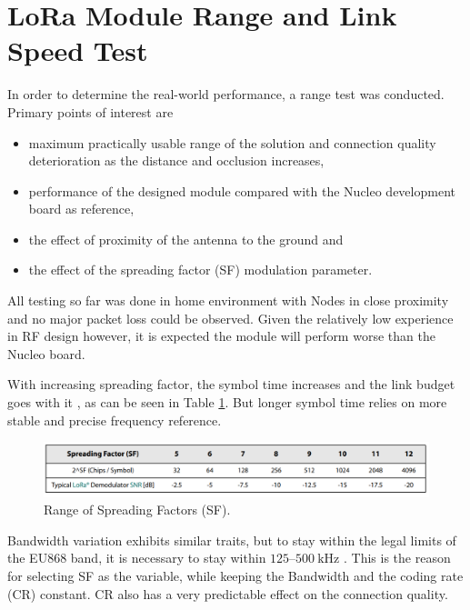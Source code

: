 
\section{\label{section:range-test}LoRa Module Range and Link Speed Test}
In order to determine the real-world performance, a range test was conducted. Primary points of interest are
\begin{itemize}
    \item maximum practically usable range of the solution and connection quality deterioration as the distance and occlusion increases,
    \item performance of the designed module compared with the Nucleo development board as reference,
    \item the effect of proximity of the antenna to the ground and
    \item the effect of the spreading factor (SF) modulation parameter.
\end{itemize}

All testing so far was done in home environment with Nodes in close proximity and no major packet loss could be observed. Given the relatively low experience in RF design however, it is expected the module will perform worse than the Nucleo board.

With increasing spreading factor, the symbol time increases and the link budget goes with it \cite{semtech_corporation_sx12612_2024}, as can be seen in Table \ref{table:semtech-sf}. But longer symbol time relies on more stable and precise frequency reference. 

\begin{figure}[H]
    \includegraphics[width=\textwidth]{fig/semtech-sf-table.png}
    \caption{\label{table:semtech-sf}Range of Spreading Factors (SF).}
\end{figure}

Bandwidth variation exhibits similar traits, but to stay within the legal limits of the EU868 band, it is necessary to stay within $125\text{--}500~\mathrm{kHz}$ \cite{etsi_short_2018, thethingsnetwork_eu863-870_nodate}. This is the reason for selecting SF as the variable, while keeping the Bandwidth and the coding rate (CR) constant. CR also has a very predictable effect on the connection quality.


